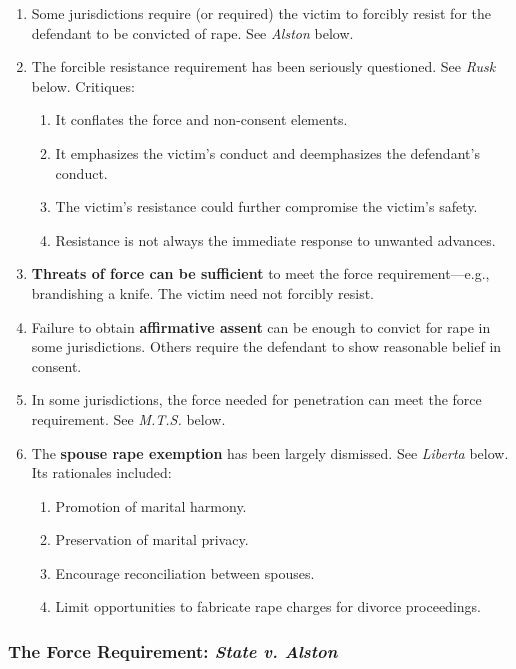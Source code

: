 \begin{enumerate}
    \item Some jurisdictions require (or required) the victim to forcibly 
    resist for the defendant to be convicted of rape. See \emph{Alston} below.
    \item The forcible resistance requirement has been seriously questioned.  
    See \emph{Rusk} below. Critiques:
    \begin{enumerate}
        \item It conflates the force and non-consent elements.
        \item It emphasizes the victim's conduct and deemphasizes the 
        defendant's conduct.
        \item The victim's resistance could further compromise the victim's 
        safety.
        \item Resistance is not always the immediate response to unwanted 
        advances.
    \end{enumerate}
    \item \textbf{Threats of force can be sufficient} to meet the force 
    requirement---e.g., brandishing a knife. The victim need not forcibly 
    resist.
    \item Failure to obtain \textbf{affirmative assent} can be enough to 
    convict for rape in some jurisdictions. Others require the defendant to 
    show reasonable belief in consent.
    \item In some jurisdictions, the force needed for penetration can meet the 
    force requirement. See \emph{M.T.S.} below.
    \item The \textbf{spouse rape exemption} has been largely dismissed. See 
    \emph{Liberta} below. Its rationales included:
    \begin{enumerate}
        \item Promotion of marital harmony.
        \item Preservation of marital privacy.
        \item Encourage reconciliation between spouses.
        \item Limit opportunities to fabricate rape charges for divorce 
        proceedings.
    \end{enumerate}
\end{enumerate}

\subsubsection{The Force Requirement: \emph{State v. Alston}}

